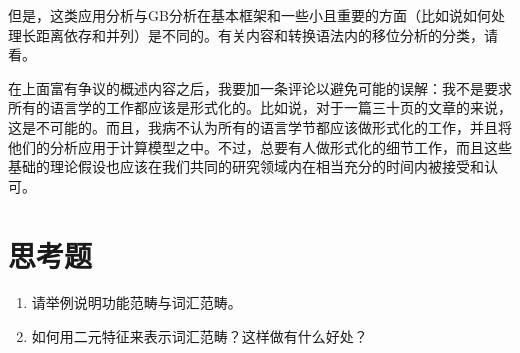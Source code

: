 但是，这类应用分析与GB分析在基本框架和一些小且重要的方面（比如说如何处理长距离依存和并列\citep{Gazdar81}）是不同的。有关内容和转换语法内的移位分析的分类，请看。

在上面富有争议的概述内容之后，我要加一条评论以避免可能的误解：我不是要求所有的语言学的工作都应该是形式化的。比如说，对于一篇三十页的文章的来说，这是不可能的。而且，我病不认为所有的语言学节都应该做形式化的工作，并且将他们的分析应用于计算模型之中。不过，总要有人做形式化的细节工作，而且这些基础的理论假设也应该在我们共同的研究领域内在相当充分的时间内被接受和认可。



\section*{思考题}

\begin{enumerate}
\item 请举例说明功能范畴与词汇范畴。
\item 如何用二元特征来表示词汇范畴？这样做有什么好处？
\end{enumerate}

